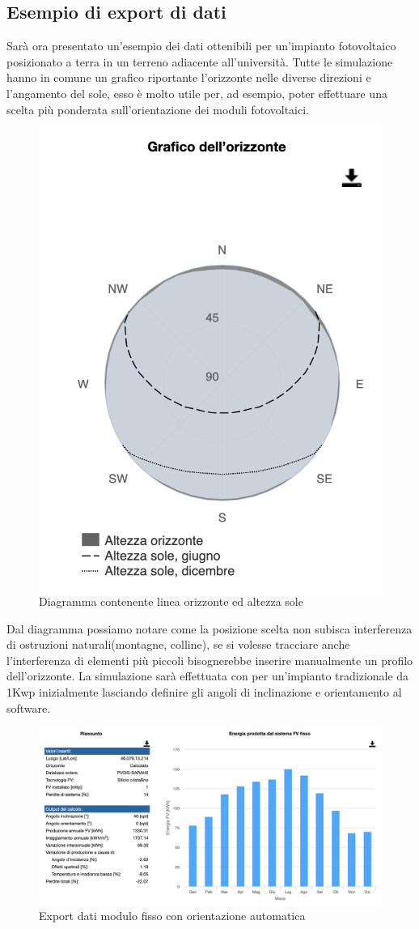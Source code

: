 \subsection{Esempio di export di dati}
Sarà ora presentato un'esempio dei dati ottenibili per un'impianto fotovoltaico posizionato a terra in un terreno adiacente all'università.
Tutte le simulazione hanno in comune un grafico riportante l'orizzonte nelle diverse direzioni e l'angamento del sole, esso è molto utile per, ad esempio, poter effettuare una scelta più ponderata sull'orientazione dei moduli fotovoltaici.
\begin{figure}[H]
    \centering
    \includegraphics[height=0.5\textwidth]{res/cap 4/orizzonte}
    \caption{Diagramma contenente linea orizzonte ed altezza sole}
    \label{fig:orizzonte}
\end{figure}\noindent
Dal diagramma possiamo notare come la posizione scelta non subisca interferenza di ostruzioni naturali(montagne, colline), se si volesse tracciare anche l'interferenza di elementi più piccoli bisognerebbe inserire manualmente un profilo dell'orizzonte.
La simulazione sarà effettuata con per un'impianto tradizionale da 1Kwp inizialmente lasciando definire gli angoli di inclinazione e orientamento al software.
\begin{figure}[H]
    \centering
    \includegraphics[height=0.5\textwidth]{res/cap 4/fissi uniud-auto}
    \caption{Export dati modulo fisso con orientazione automatica}
    \label{fig:export}
\end{figure}\noindent
